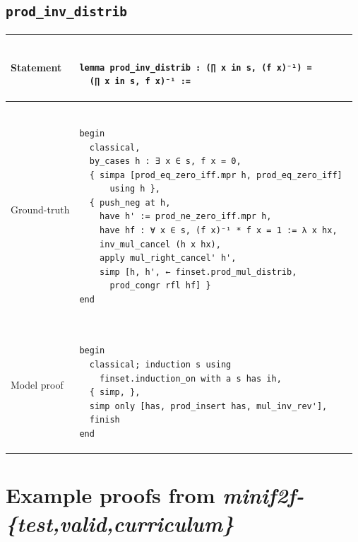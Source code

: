 \documentclass[nohyperref]{article}
\theoremstyle{plain}
\theoremstyle{definition}
\theoremstyle{remark}
\begin{document}
\subsection*{\texttt{prod\_inv\_distrib}}
\begin{table}[h]
\begin{small}
\begin{tabular}{|p{3.5cm}|p{12.5cm}|} 
  \hline 
  \centering Statement & 
  \begin{minipage}{11 cm}
    \begin{verbatim} 
 
lemma prod_inv_distrib : (∏ x in s, (f x)⁻¹) =
  (∏ x in s, f x)⁻¹ :=
    \end{verbatim} 
  \end{minipage} \\
  \hline 
  \centering Ground-truth & 
  \begin{minipage}{11 cm}
    \begin{verbatim} 
 
begin
  classical,
  by_cases h : ∃ x ∈ s, f x = 0,
  { simpa [prod_eq_zero_iff.mpr h, prod_eq_zero_iff] 
      using h },
  { push_neg at h,
    have h' := prod_ne_zero_iff.mpr h,
    have hf : ∀ x ∈ s, (f x)⁻¹ * f x = 1 := λ x hx, 
    inv_mul_cancel (h x hx),
    apply mul_right_cancel' h',
    simp [h, h', ← finset.prod_mul_distrib,
      prod_congr rfl hf] }
end
    \end{verbatim} 
  \end{minipage} \\
  \hline 
  \centering Model proof & 
  \begin{minipage}{11 cm}
    \begin{verbatim} 
 
begin
  classical; induction s using 
    finset.induction_on with a s has ih,
  { simp, },
  simp only [has, prod_insert has, mul_inv_rev'],
  finish
end
    \end{verbatim} 
  \end{minipage} \\
  \hline
\end{tabular}
\end{small}
\end{table}



\newpage
\section{Example proofs from \textit{minif2f-\{test,valid,curriculum\}}}
\label{appendix-proofs}
\end{document}
